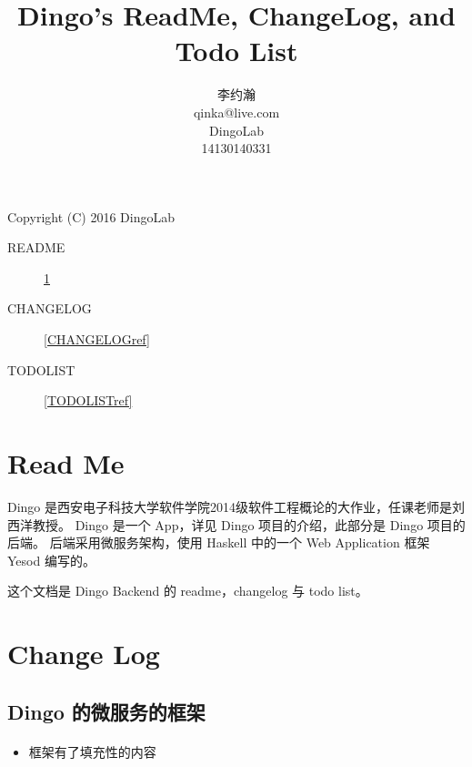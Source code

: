 







\makeatletter
\def\@NoStyleChaper{\ralex} %
\def\@RTCDoc{\ralex} %
\def\@UsingAppendix{\ralex} %
\def\@DocType{article}
\def\@DocTypeCTEX{ctexart}
\makeatother


\doclass

\title{Dingo's ReadMe, ChangeLog, and Todo List}
\author{李约瀚 \\ qinka@live.com \\ DingoLab \\ 14130140331}


  \maketitle
  \newpage
  \Huge{Copyright (C) 2016 DingoLab}
  \newpage
  \begin{description}
    \item[README] \ref{READMEref}
    \item[CHANGELOG] \ref{CHANGELOGref}
    \item[TODOLIST] \ref{TODOLISTref}
  \end{description}
  \section{Read Me} \label{READMEref}
  Dingo 是西安电子科技大学软件学院2014级软件工程概论的大作业，任课老师是刘西洋教授。
  Dingo 是一个 App，详见 Dingo 项目的介绍，此部分是 Dingo 项目的后端。
  后端采用微服务架构，使用 Haskell 中的一个 Web Application 框架 Yesod 编写的。

  这个文档是 Dingo Backend 的 readme，changelog 与 todo list。
  \section{Change Log} \label{CHANGLOGref}

  \subsection{Dingo 的微服务的框架}
  \paragraph{}
  \begin{itemize}
    \item 框架有了填充性的内容
  \end{itemize}

